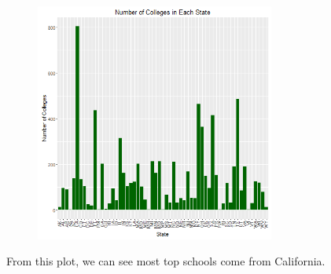 \documentclass{article}
\begin{document}
\begin{figure}[H]
\includegraphics[width=0.7\textwidth]{../images/college-frequency.png}
\end{figure}
From this plot, we can see most top schools come from California. 

\clearpage
\end{document}
